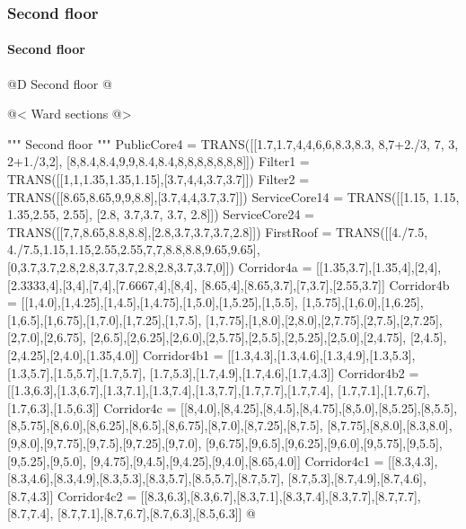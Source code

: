\documentclass[11pt,oneside]{article}    %
\begin{document}
\subsubsection{Second floor}
\paragraph{Second floor}
@D Second floor
@{
@< Ward sections @>

""" Second floor """
PublicCore4 = TRANS([[1.7,1.7,4,4,6,6,8.3,8.3, 8,7+2./3, 7, 3, 2+1./3,2],
    [8,8.4,8.4,9,9,8.4,8.4,8,8,8,8,8,8,8]])
Filter1 = TRANS([[1,1,1.35,1.35,1.15],[3.7,4,4,3.7,3.7]])
Filter2 = TRANS([[8.65,8.65,9,9,8.8],[3.7,4,4,3.7,3.7]])
ServiceCore14 = TRANS([[1.15, 1.15, 1.35,2.55, 2.55], [2.8, 3.7,3.7, 3.7, 2.8]])
ServiceCore24 = TRANS([[7,7,8.65,8.8,8.8],[2.8,3.7,3.7,3.7,2.8]])
FirstRoof = TRANS([[4./7.5, 4./7.5,1.15,1.15,2.55,2.55,7,7,8.8,8.8,9.65,9.65],
    [0,3.7,3.7,2.8,2.8,3.7,3.7,2.8,2.8,3.7,3.7,0]])
Corridor4a = [[1.35,3.7],[1.35,4],[2,4],[2.3333,4],[3,4],[7,4],[7.6667,4],[8,4],
    [8.65,4],[8.65,3.7],[7,3.7],[2.55,3.7]]
Corridor4b = [[1,4.0],[1,4.25],[1,4.5],[1,4.75],[1,5.0],[1,5.25],[1,5.5],
    [1,5.75],[1,6.0],[1,6.25],[1,6.5],[1,6.75],[1,7.0],[1,7.25],[1,7.5],
    [1,7.75],[1,8.0],[2,8.0],[2,7.75],[2,7.5],[2,7.25],[2,7.0],[2,6.75],
    [2,6.5],[2,6.25],[2,6.0],[2,5.75],[2,5.5],[2,5.25],[2,5.0],[2,4.75],
    [2,4.5],[2,4.25],[2,4.0],[1.35,4.0]]
Corridor4b1 = [[1.3,4.3],[1.3,4.6],[1.3,4.9],[1.3,5.3],[1.3,5.7],[1.5,5.7],[1.7,5.7],
    [1.7,5.3],[1.7,4.9],[1.7,4.6],[1.7,4.3]]
Corridor4b2 = [[1.3,6.3],[1.3,6.7],[1.3,7.1],[1.3,7.4],[1.3,7.7],[1.7,7.7],[1.7,7.4],
    [1.7,7.1],[1.7,6.7],[1.7,6.3],[1.5,6.3]]
Corridor4c = [[8,4.0],[8,4.25],[8,4.5],[8,4.75],[8,5.0],[8,5.25],[8,5.5],
    [8,5.75],[8,6.0],[8,6.25],[8,6.5],[8,6.75],[8,7.0],[8,7.25],[8,7.5],
    [8,7.75],[8,8.0],[8.3,8.0],[9,8.0],[9,7.75],[9,7.5],[9,7.25],[9,7.0],
    [9,6.75],[9,6.5],[9,6.25],[9,6.0],[9,5.75],[9,5.5],[9,5.25],[9,5.0],
    [9,4.75],[9,4.5],[9,4.25],[9,4.0],[8.65,4.0]]
Corridor4c1 = [[8.3,4.3],[8.3,4.6],[8.3,4.9],[8.3,5.3],[8.3,5.7],[8.5,5.7],[8.7,5.7],
    [8.7,5.3],[8.7,4.9],[8.7,4.6],[8.7,4.3]]
Corridor4c2 = [[8.3,6.3],[8.3,6.7],[8.3,7.1],[8.3,7.4],[8.3,7.7],[8.7,7.7],[8.7,7.4],
    [8.7,7.1],[8.7,6.7],[8.7,6.3],[8.5,6.3]]
@}
\end{document}
